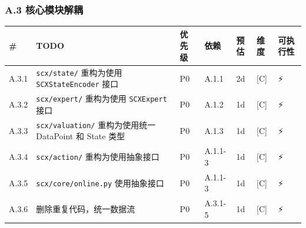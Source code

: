 \documentclass[
  12pt,
]{ctexart}
\begin{document}
\subsubsection{A.3
核心模块解耦}\label{a.3-ux6838ux5fc3ux6a21ux5757ux89e3ux8026}

\begin{longtable}[]{@{}
  >{\raggedright\arraybackslash}p{}
  >{\raggedright\arraybackslash}p{}
  >{\raggedright\arraybackslash}p{}
  >{\raggedright\arraybackslash}p{}
  >{\raggedright\arraybackslash}p{}
  >{\raggedright\arraybackslash}p{}
  >{\raggedright\arraybackslash}p{}@{}}
\toprule\noalign{}
\begin{minipage}[b]{\linewidth}\raggedright
\#
\end{minipage} & \begin{minipage}[b]{\linewidth}\raggedright
TODO
\end{minipage} & \begin{minipage}[b]{\linewidth}\raggedright
优先级
\end{minipage} & \begin{minipage}[b]{\linewidth}\raggedright
依赖
\end{minipage} & \begin{minipage}[b]{\linewidth}\raggedright
预估
\end{minipage} & \begin{minipage}[b]{\linewidth}\raggedright
维度
\end{minipage} & \begin{minipage}[b]{\linewidth}\raggedright
可执行性
\end{minipage} \\
\midrule\noalign{}
\endhead
\bottomrule\noalign{}
\endlastfoot
A.3.1 & \texttt{scx/state/} 重构为使用 \texttt{SCXStateEncoder} 接口 &
P0 & A.1.1 & 2d & {[}C{]} & ⚡ \\
A.3.2 & \texttt{scx/expert/} 重构为使用 \texttt{SCXExpert} 接口 & P0 &
A.1.2 & 1d & {[}C{]} & ⚡ \\
A.3.3 & \texttt{scx/valuation/} 重构为使用统一 DataPoint 和 State 类型 &
P0 & A.1.3 & 1d & {[}C{]} & ⚡ \\
A.3.4 & \texttt{scx/action/} 重构为使用抽象接口 & P0 & A.1.1-3 & 1d &
{[}C{]} & ⚡ \\
A.3.5 & \texttt{scx/core/online.py} 使用抽象接口 & P0 & A.1.1-3 & 1d &
{[}C{]} & ⚡ \\
A.3.6 & 删除重复代码，统一数据流 & P0 & A.3.1-5 & 1d & {[}C{]} & ⚡ \\
\end{longtable}
\end{document}
